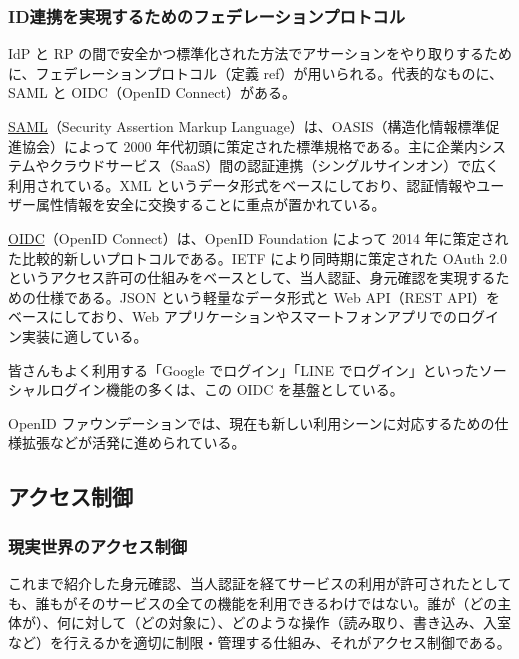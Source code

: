 \documentclass[uplatex]{jsarticle}
\def\ref#1{ref}%
\def\label#1{}%
\begin{document}
\subsubsection{ID連携を実現するためのフェデレーションプロトコル}

IdP と RP の間で安全かつ標準化された方法でアサーションをやり取りするために、フェデレーションプロトコル（定義 \ref{dfn:federation-protocol}）が用いられる。代表的なものに、SAML と OIDC（OpenID Connect）がある。

\begin{dfn}[SAML]\label{dfn:ch2b-saml}
\underline{SAML}（Security Assertion Markup Language）は、OASIS（構造化情報標準促進協会）によって 2000 年代初頭に策定された標準規格である。主に企業内システムやクラウドサービス（SaaS）間の認証連携（シングルサインオン）で広く利用されている。XML というデータ形式をベースにしており、認証情報やユーザー属性情報を安全に交換することに重点が置かれている。
\end{dfn}

\begin{dfn}\label{dfn:ch2b-oidc}
\underline{OIDC}（OpenID Connect）は、OpenID Foundation によって 2014 年に策定された比較的新しいプロトコルである。IETF により同時期に策定された OAuth 2.0 というアクセス許可の仕組みをベースとして、当人認証、身元確認を実現するための仕様である。JSON という軽量なデータ形式と Web API（REST API）をベースにしており、Web アプリケーションやスマートフォンアプリでのログイン実装に適している。
\end{dfn}

\begin{exa}[ソーシャルログイン]\label{exa:ch2b-social-login}
皆さんもよく利用する「Google でログイン」「LINE でログイン」といったソーシャルログイン機能の多くは、この OIDC を基盤としている。
\end{exa}

OpenID ファウンデーションでは、現在も新しい利用シーンに対応するための仕様拡張などが活発に進められている。

\subsection{アクセス制御}\label{subsec:ch2b-access-control}

\subsubsection{現実世界のアクセス制御}

これまで紹介した身元確認、当人認証を経てサービスの利用が許可されたとしても、誰もがそのサービスの全ての機能を利用できるわけではない。誰が（どの主体が）、何に対して（どの対象に）、どのような操作（読み取り、書き込み、入室など）を行えるかを適切に制限・管理する仕組み、それがアクセス制御である。
\end{document}
